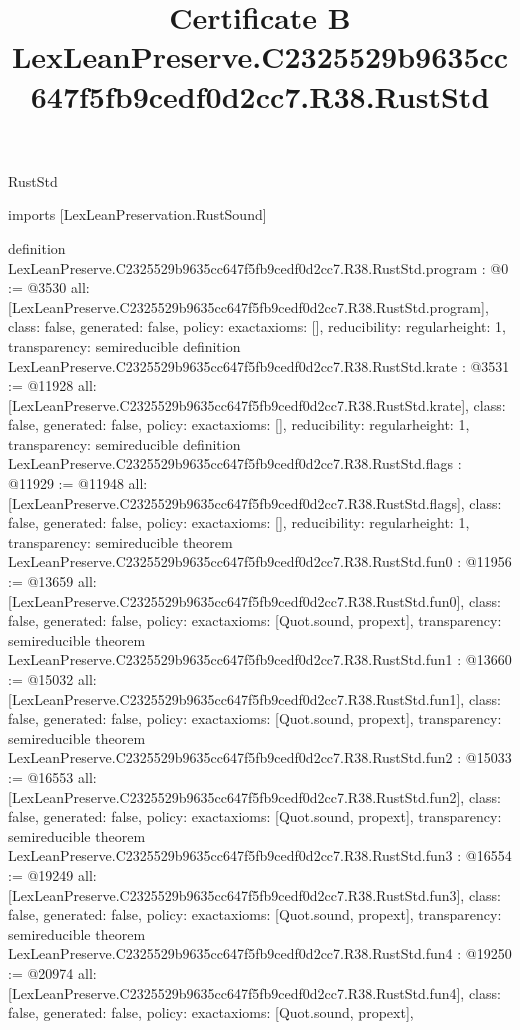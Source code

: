 \begin{lexlean}{RustStd}
\title{Certificate B LexLeanPreserve.C2325529b9635cc647f5fb9cedf0d2cc7.R38.RustStd}
\begin{coremodule}
imports [LexLeanPreservation.RustSound]

definition LexLeanPreserve.C2325529b9635cc647f5fb9cedf0d2cc7.R38.RustStd.program : @0 := @3530 {
  all: [LexLeanPreserve.C2325529b9635cc647f5fb9cedf0d2cc7.R38.RustStd.program],
  class: false,
  generated: false,
  policy: exact{axioms: []},
  reducibility: regular{height: 1},
  transparency: semireducible
}
definition LexLeanPreserve.C2325529b9635cc647f5fb9cedf0d2cc7.R38.RustStd.krate : @3531 := @11928 {
  all: [LexLeanPreserve.C2325529b9635cc647f5fb9cedf0d2cc7.R38.RustStd.krate],
  class: false,
  generated: false,
  policy: exact{axioms: []},
  reducibility: regular{height: 1},
  transparency: semireducible
}
definition LexLeanPreserve.C2325529b9635cc647f5fb9cedf0d2cc7.R38.RustStd.flags : @11929 := @11948 {
  all: [LexLeanPreserve.C2325529b9635cc647f5fb9cedf0d2cc7.R38.RustStd.flags],
  class: false,
  generated: false,
  policy: exact{axioms: []},
  reducibility: regular{height: 1},
  transparency: semireducible
}
theorem LexLeanPreserve.C2325529b9635cc647f5fb9cedf0d2cc7.R38.RustStd.fun0 : @11956 := @13659 {
  all: [LexLeanPreserve.C2325529b9635cc647f5fb9cedf0d2cc7.R38.RustStd.fun0],
  class: false,
  generated: false,
  policy: exact{axioms: [Quot.sound, propext]},
  transparency: semireducible
}
theorem LexLeanPreserve.C2325529b9635cc647f5fb9cedf0d2cc7.R38.RustStd.fun1 : @13660 := @15032 {
  all: [LexLeanPreserve.C2325529b9635cc647f5fb9cedf0d2cc7.R38.RustStd.fun1],
  class: false,
  generated: false,
  policy: exact{axioms: [Quot.sound, propext]},
  transparency: semireducible
}
theorem LexLeanPreserve.C2325529b9635cc647f5fb9cedf0d2cc7.R38.RustStd.fun2 : @15033 := @16553 {
  all: [LexLeanPreserve.C2325529b9635cc647f5fb9cedf0d2cc7.R38.RustStd.fun2],
  class: false,
  generated: false,
  policy: exact{axioms: [Quot.sound, propext]},
  transparency: semireducible
}
theorem LexLeanPreserve.C2325529b9635cc647f5fb9cedf0d2cc7.R38.RustStd.fun3 : @16554 := @19249 {
  all: [LexLeanPreserve.C2325529b9635cc647f5fb9cedf0d2cc7.R38.RustStd.fun3],
  class: false,
  generated: false,
  policy: exact{axioms: [Quot.sound, propext]},
  transparency: semireducible
}
theorem LexLeanPreserve.C2325529b9635cc647f5fb9cedf0d2cc7.R38.RustStd.fun4 : @19250 := @20974 {
  all: [LexLeanPreserve.C2325529b9635cc647f5fb9cedf0d2cc7.R38.RustStd.fun4],
  class: false,
  generated: false,
  policy: exact{axioms: [Quot.sound, propext]},
}
\end{coremodule}
\end{lexlean}
